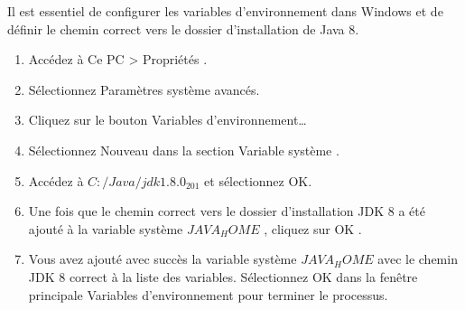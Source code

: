 Il est essentiel de configurer les variables d'environnement dans Windows et de définir le chemin correct vers le dossier d'installation de Java 8.
\begin{enumerate}
\item Accédez à Ce PC > Propriétés .
\item Sélectionnez Paramètres système avancés.
\item Cliquez sur le bouton Variables d'environnement… 
\item Sélectionnez Nouveau dans la section Variable système .
\item Accédez à $C:/Java/jdk1.8.0_201$ et sélectionnez OK.
\item Une fois que le chemin correct vers le dossier d'installation JDK 8 a été ajouté à la variable système $JAVA_HOME$ , cliquez sur OK .
\item Vous avez ajouté avec succès la variable système $JAVA_HOME$ avec le chemin JDK 8 correct à la liste des variables. Sélectionnez OK dans la fenêtre principale Variables d'environnement pour terminer le processus.
\end{enumerate}